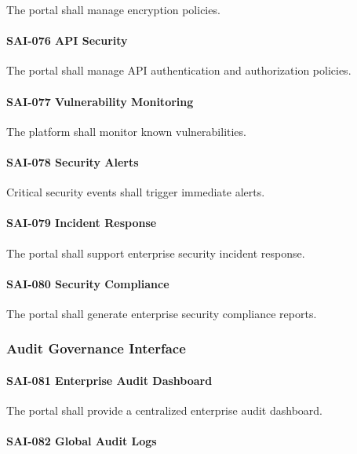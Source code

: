 The portal shall manage encryption policies.

\paragraph{SAI-076 API Security}

The portal shall manage API authentication and authorization policies.

\paragraph{SAI-077 Vulnerability Monitoring}

The platform shall monitor known vulnerabilities.

\paragraph{SAI-078 Security Alerts}

Critical security events shall trigger immediate alerts.

\paragraph{SAI-079 Incident Response}

The portal shall support enterprise security incident response.

\paragraph{SAI-080 Security Compliance}

The portal shall generate enterprise security compliance reports.


\subsubsection*{Audit Governance Interface}

\paragraph{SAI-081 Enterprise Audit Dashboard}

The portal shall provide a centralized enterprise audit dashboard.

\paragraph{SAI-082 Global Audit Logs}

